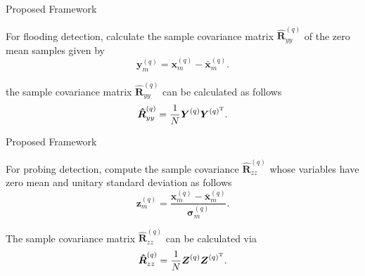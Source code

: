 \documentclass[newPxFont, numfooter, sectionpages]{beamer}
\begin{document}
\begin{frame}{Proposed Framework}
	
	For flooding detection, calculate the sample covariance matrix $\boldsymbol{\hat{R}}_{yy}^{(q)}$ of the zero mean samples given by
	\begin{equation}\label{eq:eq02}
		\boldsymbol{y}_{m}^{(q)} = \boldsymbol{x}_{m}^{(q)} - \bar{\boldsymbol{x}}_{m}^{(q)}.
	\end{equation}

	the sample covariance matrix $\boldsymbol{\hat{R}}_{yy}^{(q)}$ can be calculated as follows
	\begin{equation}\label{eq:eq03}
		\boldsymbol{\hat{R}}_{yy}^{(q)} = \frac{1}{N}\boldsymbol{Y}^{(q)}\boldsymbol{Y}^{(q)^{\rm T}}.
	\end{equation}

\end{frame}
\begin{frame}{Proposed Framework}
	
	For probing detection, compute the sample covariance $\boldsymbol{\hat{R}}_{zz}^{(q)}$ whose variables have zero mean and unitary standard deviation as follows
	\begin{equation}\label{eq:eq04}
		\boldsymbol{z}_{m}^{(q)} = \frac{\boldsymbol{x}_{m}^{(q)} - \bar{\boldsymbol{x}}_{m}^{(q)}}{\boldsymbol{\sigma}_{m}^{(q)}}.
	\end{equation}

	The sample covariance matrix $\boldsymbol{\hat{R}}_{zz}^{(q)}$ can be calculated via 
	\begin{equation}\label{eq:eq05}
		\boldsymbol{\hat{R}}_{zz}^{(q)} = \frac{1}{N}\boldsymbol{Z}^{(q)}\boldsymbol{Z}^{(q)^{\rm T}}.
	\end{equation}

\end{frame}
\end{document}
